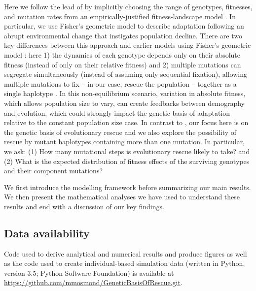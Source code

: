 \documentclass[9pt,twocolumn,twoside,lineno]{gsajnl}
\begin{document}
Here we follow the lead of \cite{Anciaux2018} by implicitly choosing the range of genotypes, fitnesses, and mutation rates from an empirically-justified fitness-landscape model \citep{Tenaillon2014}.
In particular, we use Fisher's geometric model to describe adaptation following an abrupt environmental change that instigates population decline.
There are two key differences between this approach and earlier models using Fisher's geometric model \citep[e.g.,][]{Orr1998}:
here
1) the dynamics of each genotype depends only on their absolute fitness (instead of only on their relative fitness) and
2) multiple mutations can segregate simultaneously (instead of assuming only sequential fixation), allowing multiple mutations to fix -- in our case, rescue the population -- together as a single haplotype \citep[i.e., stochastic tunnelling,][]{iwasa2004stochastic}.
In this non-equilibrium scenario, variation in absolute fitness, which allows population size to vary, can create feedbacks between demography and evolution, which could strongly impact the genetic basis of adaptation relative to the constant population size case.
In contrast to \cite{Anciaux2018}, our focus here is on the genetic basis of evolutionary rescue and we also explore the possibility of rescue by mutant haplotypes containing more than one mutation.
In particular, we ask: (1) How many mutational steps is evolutionary rescue likely to take? and (2) What is the expected distribution of fitness effects of the surviving genotypes and their component mutations?

We first introduce the modelling framework before summarizing our main results.
We then present the mathematical analyses we have used to understand these results and end with a discussion of our key findings.

\subsection{Data availability}

Code used to derive analytical and numerical results and produce figures \citep[written in Mathematica, version 9.0;][also provided as CDF and PDF]{Mathematica} as well as the code used to create individual-based simulation data (written in Python, version 3.5; Python Software Foundation) is available at \url{https://github.com/mmosmond/GeneticBasisOfRescue.git}.

\end{document}
